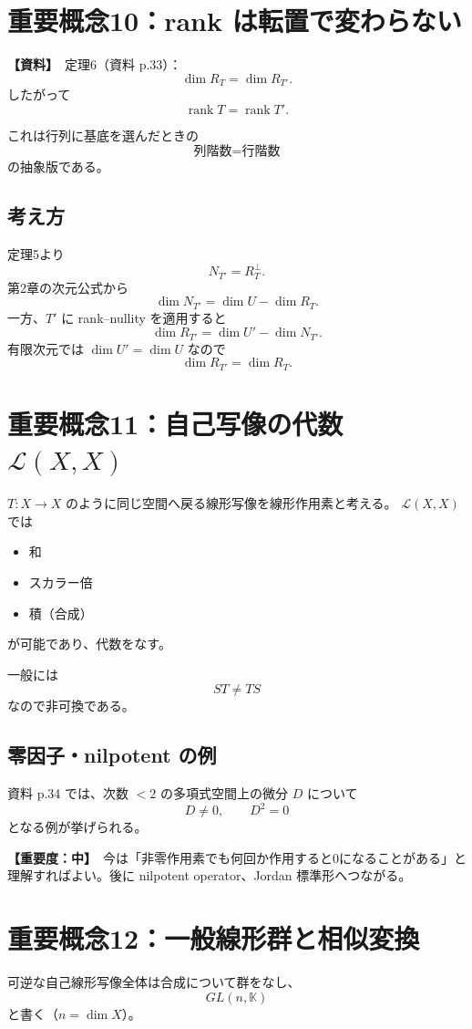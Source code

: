 \documentclass[a4paper,11pt]{ltjsarticle}
\newcommand{\K}{\mathbb{K}}
\newcommand{\rank}{\operatorname{rank}}
\newcommand{\Lcal}{\mathcal{L}}
\newcommand{\sourceitem}{\textbf{【資料】}}
\newcommand{\midimportance}{\textbf{【重要度：中】}}
\begin{document}
\section{重要概念10：rank は転置で変わらない}

\sourceitem\ 定理6（資料 p.33）：
\[
\boxed{\dim R_T=\dim R_{T'}.}
\]
したがって
\[
\boxed{\rank T=\rank T'.}
\]

これは行列に基底を選んだときの
\[
\boxed{\text{列階数}=\text{行階数}}
\]
の抽象版である。

\subsection{考え方}
定理5より
\[
N_{T'}=R_T^\perp.
\]
第2章の次元公式から
\[
\dim N_{T'}=\dim U-\dim R_T.
\]
一方、$T'$ に rank--nullity を適用すると
\[
\dim R_{T'}=\dim U'-\dim N_{T'}.
\]
有限次元では $\dim U'=\dim U$ なので
\[
\dim R_{T'}=\dim R_T.
\]

\section{重要概念11：自己写像の代数 $\Lcal(X,X)$}

$T:X\to X$ のように同じ空間へ戻る線形写像を線形作用素と考える。
$\Lcal(X,X)$ では
\begin{itemize}
  \item 和
  \item スカラー倍
  \item 積（合成）
\end{itemize}
が可能であり、代数をなす。

一般には
\[
ST\ne TS
\]
なので非可換である。

\subsection{零因子・nilpotent の例}
資料 p.34 では、次数 $<2$ の多項式空間上の微分 $D$ について
\[
D\ne0,
\qquad
D^2=0
\]
となる例が挙げられる。

\midimportance\ 今は「非零作用素でも何回か作用すると0になることがある」と理解すればよい。後に nilpotent operator、Jordan 標準形へつながる。

\section{重要概念12：一般線形群と相似変換}

可逆な自己線形写像全体は合成について群をなし、
\[
GL(n,\K)
\]
と書く（$n=\dim X$）。
\end{document}
